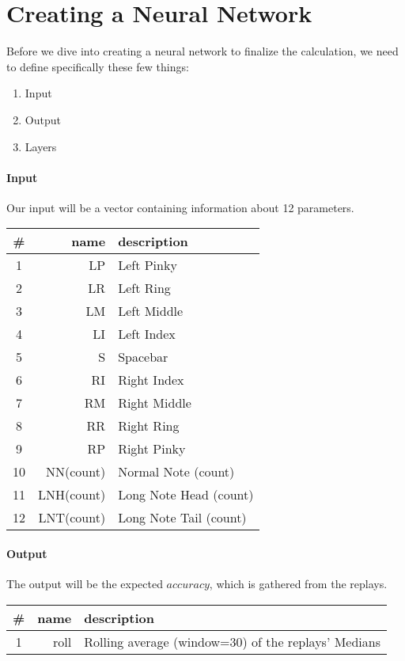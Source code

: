 

\section{Creating a Neural Network}

Before we dive into creating a neural network to finalize the calculation, we need to define specifically these few things:

\begin{enumerate}
	\item Input
	\item Output
	\item Layers
\end{enumerate}

\paragraph{Input} Our input will be a vector containing information about 12 parameters.

\begin{tabular}{|c|r|l|} 
\hline
\# & name & description \\
\hline
1 & LP  		& Left Pinky \\
2 & LR  		& Left Ring \\
3 & LM  		& Left Middle \\
4 & LI 			& Left Index \\
5 & S   		& Spacebar \\
6 & RI 			& Right Index \\
7 & RM 			& Right Middle \\
8 & RR 			& Right Ring \\
9 & RP 			& Right Pinky \\
10& NN(count)	& Normal Note (count) \\
11& LNH(count)	& Long Note Head (count) \\
12& LNT(count)	& Long Note Tail (count) \\
\hline
\end{tabular}	

\paragraph{Output} The output will be the expected $accuracy$, which is gathered from the replays.

\begin{tabular}{|c|r|l|} 
\hline
\# & name & description \\
\hline
1 & roll  		& Rolling average (window=30) of the replays' Medians \\
\hline
\end{tabular}	

